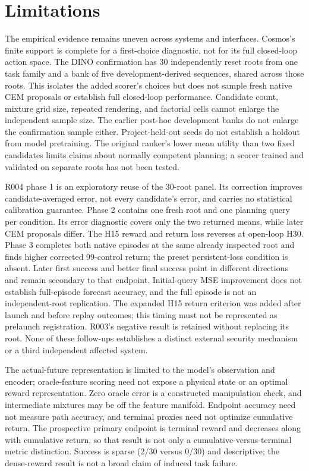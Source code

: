 \documentclass[11pt]{article}
\begin{document}
\section{Limitations}
The empirical evidence remains uneven across systems and interfaces.
Cosmos's finite support is complete for a first-choice diagnostic, not for
its full closed-loop action space. The DINO confirmation has 30 independently
reset roots from one task family and a bank of five development-derived
sequences, shared across those roots. This isolates the added scorer's choices
but does not sample fresh native CEM proposals or establish full closed-loop
performance. Candidate count, mixture grid size, repeated rendering, and
factorial cells cannot enlarge the independent sample size. The earlier
post-hoc development banks do not enlarge the confirmation sample either.
Project-held-out seeds do not establish a holdout from model pretraining.
The original ranker's lower mean utility than two fixed candidates limits
claims about normally competent planning; a scorer trained and validated on
separate roots has not been tested.

R004 phase 1 is an exploratory reuse of the 30-root panel. Its correction
improves candidate-averaged error, not every candidate's error, and carries
no statistical calibration guarantee. Phase 2 contains one fresh root and
one planning query per condition. Its error diagnostic covers only the two
returned means, while later CEM proposals differ. The H15 reward and return
loss reverses at open-loop H30. Phase 3 completes both native episodes at the
same already inspected root and finds higher corrected 99-control return;
the preset persistent-loss condition is absent. Later first success and better
final success point in different directions and remain secondary to that
endpoint. Initial-query MSE improvement does not establish full-episode
forecast accuracy, and the full episode is not an independent-root replication.
The expanded H15 return criterion was added after
launch and before replay outcomes; this timing must not be represented as
prelaunch registration. R003's negative result is retained without replacing
its root. None of these follow-ups establishes a distinct external security
mechanism or a third independent affected system.

The actual-future representation is limited to the model's observation and
encoder; oracle-feature scoring need not expose a physical state or an optimal
reward representation. Zero oracle error is a constructed manipulation check,
and intermediate mixtures may be off the feature manifold. Endpoint accuracy
need not measure path accuracy, and terminal proxies need not optimize cumulative
return. The prospective primary endpoint is terminal reward and decreases along
with cumulative return, so that result is not only a cumulative-versus-terminal
metric distinction. Success is sparse (2/30 versus 0/30) and descriptive; the
dense-reward result is not a broad claim of induced task failure.
\end{document}
